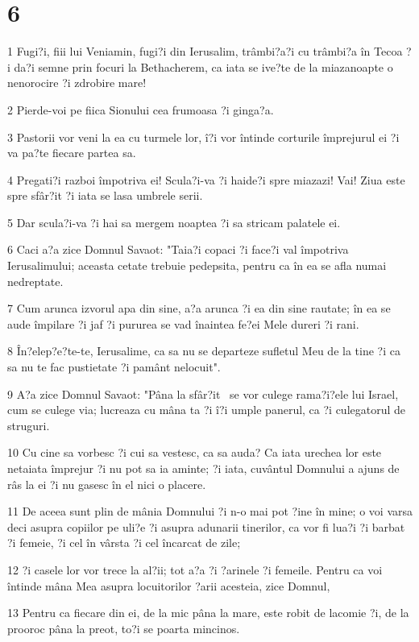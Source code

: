 \chapter{6}

\par 1 Fugi?i, fiii lui Veniamin, fugi?i din Ierusalim, trâmbi?a?i cu trâmbi?a în Tecoa ?i da?i semne prin focuri la Bethacherem, ca iata se ive?te de la miazanoapte o nenorocire ?i zdrobire mare!
\par 2 Pierde-voi pe fiica Sionului cea frumoasa ?i ginga?a.
\par 3 Pastorii vor veni la ea cu turmele lor, î?i vor întinde corturile împrejurul ei ?i va pa?te fiecare partea sa.
\par 4 Pregati?i razboi împotriva ei! Scula?i-va ?i haide?i spre miazazi! Vai! Ziua este spre sfâr?it ?i iata se lasa umbrele serii.
\par 5 Dar scula?i-va ?i hai sa mergem noaptea ?i sa stricam palatele ei.
\par 6 Caci a?a zice Domnul Savaot: "Taia?i copaci ?i face?i val împotriva Ierusalimului; aceasta cetate trebuie pedepsita, pentru ca în ea se afla numai nedreptate.
\par 7 Cum arunca izvorul apa din sine, a?a arunca ?i ea din sine rautate; în ea se aude împilare ?i jaf ?i pururea se vad înaintea fe?ei Mele dureri ?i rani.
\par 8 În?elep?e?te-te, Ierusalime, ca sa nu se departeze sufletul Meu de la tine ?i ca sa nu te fac pustietate ?i pamânt nelocuit".
\par 9 A?a zice Domnul Savaot: "Pâna la sfâr?it  se vor culege rama?i?ele lui Israel, cum se culege via; lucreaza cu mâna ta ?i î?i umple panerul, ca ?i culegatorul de struguri.
\par 10 Cu cine sa vorbesc ?i cui sa vestesc, ca sa auda? Ca iata urechea lor este netaiata împrejur ?i nu pot sa ia aminte; ?i iata, cuvântul Domnului a ajuns de râs la ei ?i nu gasesc în el nici o placere.
\par 11 De aceea sunt plin de mânia Domnului ?i n-o mai pot ?ine în mine; o voi varsa deci asupra copiilor pe uli?e ?i asupra adunarii tinerilor, ca vor fi lua?i ?i barbat ?i femeie, ?i cel în vârsta ?i cel încarcat de zile;
\par 12 ?i casele lor vor trece la al?ii; tot a?a ?i ?arinele ?i femeile. Pentru ca voi întinde mâna Mea asupra locuitorilor ?arii acesteia, zice Domnul,
\par 13 Pentru ca fiecare din ei, de la mic pâna la mare, este robit de lacomie ?i, de la prooroc pâna la preot, to?i se poarta mincinos.
